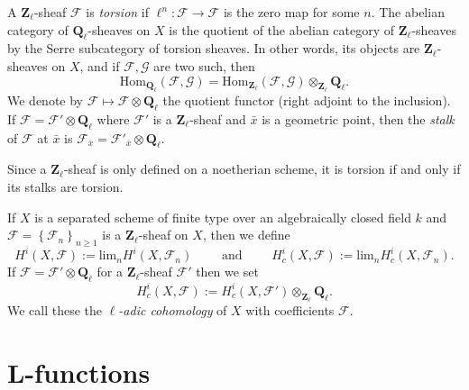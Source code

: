 \begin{definition}
\label{definition-torsion-l-adic-sheaf}
A $\mathbf{Z}_\ell$-sheaf $\mathcal{F}$ is {\it torsion} if $\ell^n:
\mathcal{F} \to \mathcal{F}$ is the zero map for some $n$. The abelian category
of $\mathbf{Q}_\ell$-sheaves on $X$ is the quotient of the abelian category of
$\mathbf{Z}_\ell$-sheaves by the Serre subcategory of torsion sheaves. In
other words, its objects are $\mathbf{Z}_\ell$-sheaves on $X$, and if
$\mathcal{F}, \mathcal{G}$ are two such, then
$$
\text{Hom}_{\mathbf{Q}_\ell} \left(\mathcal{F}, \mathcal{G} \right) =
\text{Hom}_{\mathbf{Z}_\ell} \left(\mathcal{F}, \mathcal{G}\right)
\otimes_{\mathbf{Z}_\ell} \mathbf{Q}_\ell.
$$
We denote by $\mathcal{F} \mapsto \mathcal{F} \otimes \mathbf{Q}_\ell$ the
quotient functor (right adjoint to the inclusion). If $\mathcal{F} =
\mathcal{F}' \otimes \mathbf{Q}_\ell$ where $\mathcal{F}'$ is a
$\mathbf{Z}_\ell$-sheaf and $\bar x$ is a geometric point, then the
{\it stalk} of $\mathcal{F}$ at $\bar x$ is $\mathcal{F}_{\bar x} =
\mathcal{F}'_{\bar x} \otimes \mathbf{Q}_\ell$.
\end{definition}

\begin{remark}
\label{remark-torsion-stalks}
Since a $\mathbf{Z}_\ell$-sheaf is only defined on a noetherian scheme, it is
torsion if and only if its stalks are torsion.
\end{remark}

\begin{definition}
\label{definition-cohomology-l-adic}
If $X$ is a separated scheme of finite type over an algebraically closed field
$k$ and $\mathcal{F} = \left\{\mathcal{F}_n\right\}_{n\geq 1}$ is a
$\mathbf{Z}_\ell$-sheaf on $X$, then we define
$$
H^i(X, \mathcal{F}) := \text{lim}_n H^i(X, \mathcal{F}_n)
\qquad\text{ and }\qquad
H_c^i(X, \mathcal{F}) := \text{lim}_n H_c^i(X, \mathcal{F}_n).
$$
If $\mathcal{F} = \mathcal{F}'\otimes \mathbf{Q}_\ell$ for a
$\mathbf{Z}_\ell$-sheaf $\mathcal{F}'$ then we set
$$
H_c^i(X ,\mathcal{F}) := H_c^i(X,
\mathcal{F}')\otimes_{\mathbf{Z}_\ell}\mathbf{Q}_\ell.
$$
We call these the {\it $\ell$-adic cohomology} of $X$ with coefficients
$\mathcal{F}$.
\end{definition}





\section{L-functions}
\label{section-L-function}

